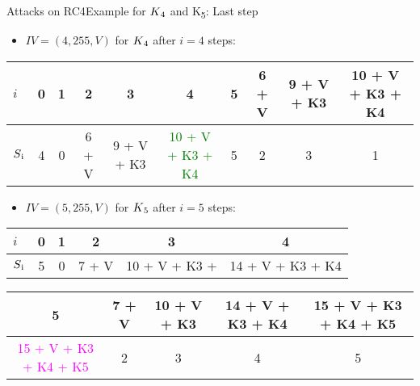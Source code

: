 \documentclass[
	aspectratio=169,	%
	onlytextwidth,		%
	t					%
	]{beamer}
\begin{document}
\begin{frame}[fragile]{Attacks on RC4}{Example for $K\textsubscript{4}$ and K\textsubscript{5}: Last step}
	\begin{itemize}
		\item $IV = (4,255,V)$ for $K\textsubscript{4}$ after $i=4$ steps:
	\end{itemize}

	\small
	
	\begin{table}[h!]
		\begin{center}
			\begin{tabular}{l|c|c|c|c|c|c|c|c|c}
			$i$ & 0 & 1 & 2 & 3 & 4 & 5 & 6 + V & 9 + V + K3 & 10 + V + K3 + K4\\
			\hline
			$S\textsubscript{i}$ & 4 & 0 & 6 + V & 9 + V + K3 & \textcolor{green}{10 + V + K3 + K4} & 5 & 2 & 3 & 1\\
			\end{tabular}
		\end{center}
	\end{table}

	\normalsize

	\begin{itemize}
		\item $IV = (5,255,V)$ for $K\textsubscript{5}$ after $i=5$ steps:
	\end{itemize}

	\small

	\begin{table}[h!]
		\begin{center}
			\begin{tabular}{l|c|c|c|c|c}
			$i$ & 0 & 1 & 2 & 3 & 4\\
			\hline
			$S\textsubscript{i}$ & 5 & 0 & 7 + V & 10 + V + K3 + & 14 + V + K3 + K4\\
			\end{tabular}
		\end{center}
	\end{table}

	\begin{table}[h!]
		\begin{center}
			\begin{tabular}{c|c|c|c|c}
			5 & 7 + V & 10 + V + K3 & 14 + V + K3 + K4 & 15 + V + K3 + K4 + K5\\
			\hline
			\textcolor{magenta}{15 + V + K3 + K4 + K5} & 2 & 3 & 4 & 5\\
			\end{tabular}
		\end{center}
	\end{table}

	\normalsize

\end{frame}
\end{document}
